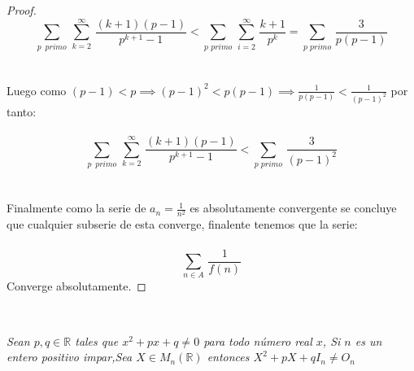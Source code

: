 \documentclass[11pt,letterpaper]{article}
\newcommand{\R}{\mathbb{R}}
\begin{document}
\begin{proof}
\begin{equation*}
    \sum_{p\,\,\,primo}\,\sum_{k=2}^{\infty}\,\frac{(k+1)(p-1)}{p^{k+1}-1}<\sum_{p\,\,primo}\,\sum_{i=2}^{\infty}\,\frac{k+1}{p^k}=\sum_{p\,\,primo}\,\frac{3}{p(p-1)}
\end{equation*}\,\\
\,\\
Luego como $(p-1)<p\implies(p-1)^2<p(p-1)\implies\frac{1}{p(p-1)}<\frac{1}{(p-1)^2}$ por tanto:\,\\
\,\\
\begin{equation*}
    \sum_{p\,\,\,primo}\,\sum_{k=2}^{\infty}\,\frac{(k+1)(p-1)}{p^{k+1}-1}<\sum_{p\,\,primo}\,\frac{3}{(p-1)^2}
\end{equation*}\,\\
\,\\
Finalmente como la serie de $a_n=\frac{1}{n^2}$ es absolutamente convergente se concluye que cualquier subserie de esta converge, finalente tenemos que la serie:\,\\
\,\\
\begin{equation*}
    \sum_{n\in A}\,\frac{1}{f(n)}
\end{equation*}
Converge absolutamente.
\end{proof}\,\\
\begin{tcolorbox}[
	title = \textcolor{black}{\textcolor{white}{Problema 3}},]
\textit{Sean $p,q\in \R$ tales que $x^2+px+q\neq 0$ para todo n\'umero real $x$, Si $n$ es un entero positivo impar,Sea
$X\in M_n(\R)$ entonces $X^2+pX+qI_n\neq O_n$
}
\end{tcolorbox}
\end{document}
